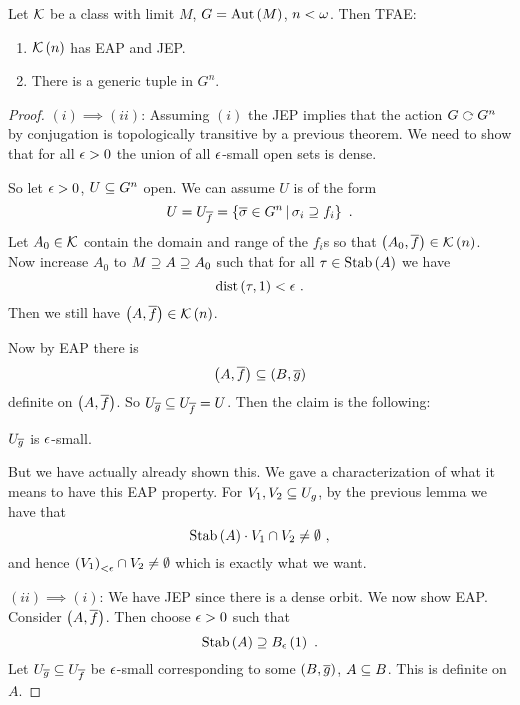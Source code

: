 \documentclass{amsart}
\begin{document}
\begin{thm}
Let $\mathcal{K}$ be a \Fraisse class with limit $M$, $G = \operatorname{Aut}\left(M\right)$, $n < \omega$.
Then TFAE:
\begin{enumerate}[label = (\iii)]
\item $\mathcal{K}\left(n\right)$ has EAP and JEP.
\item There is a generic tuple in $G^n$.
\end{enumerate}
\end{thm}
\begin{proof}
$\left(i\right)\implies \left(ii\right)$: Assuming $\left(i\right)$ the JEP implies that
the action $G\acts G^n$ by conjugation is topologically transitive by a previous theorem.
We need to show that for all $\epsilon > 0$ the union of all $\epsilon$-small open sets is dense. 

So let $\epsilon > 0$, $U\subseteq G^n$ open. We can assume $U$ is of the form 
\begin{equation}
U = U_{\oline{f}} =
\left\{ \oline{\sigma}\in G^n \st \sigma_i \supeq f_i\right\} \ .
\end{equation}
Let $A_0\in \mathcal{K}$ contain the domain and range of the $f_i$s so that
$\left(A_0 , \overline{f}\right)\in \mathcal{K}\left(n\right)$. 
Now increase $A_0$ to $M\supseteq A\supseteq A_0$ such that for all $\tau\in
\operatorname{Stab}\left(A\right)$ we have
\begin{equation}
\operatorname{dist}\left(\tau , 1\right) < \epsilon \ .
\end{equation}
Then we still have $\left(A , \overline{f}\right) \in \mathcal{K}\left(n\right)$. 

Now by EAP there is 
\begin{equation}
\left(A , \overline{f}\right) \subseteq \left(B , \overline{g}\right)
\end{equation}
definite on $\left(A , \overline{f}\right)$. 
So $U_{\overline{g}} \subseteq U_{\overline{f}} = U$. Then the claim is the following:
\begin{clm}
$U_{\overline{g}}$ is
$\epsilon$-small.
\end{clm}
But we have actually already shown this. We gave a characterization of what it means to
have this EAP property. For $V_1, V_2 \subseteq U_g$, by the previous lemma we have that 
\begin{equation}
\operatorname{Stab}\left(A\right)\cdot V_1 \cap V_2 \neq \emptyset \ ,
\end{equation}
and hence $\left(V_1\right)_{< \epsilon}\cap V_2 \neq \emptyset$ which is exactly what we want.

$\left(ii\right)\implies \left(i\right)$: We have JEP since there is a dense orbit. 
We now show EAP. Consider
$\left(A , \overline{f}\right)$. Then choose $\epsilon > 0$ such that
\begin{equation}
\Stab\left(A\right)\supeq B_\e\left(1\right) \ .
\end{equation}
Let $U_{\overline{g}} \subseteq U_{\overline{f}}$ be $\epsilon$-small corresponding to some $\left(B ,
\overline{g}\right)$, $A\subseteq B$. This is definite on $A$.
\end{proof}
\end{document}
